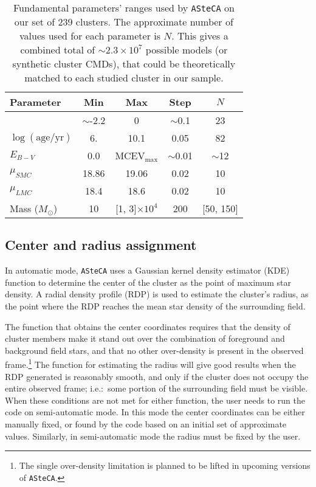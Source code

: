 \documentclass{aa}
\begin{document}
\begin{table}
\centering
\caption{Fundamental parameters' ranges used by \texttt{ASteCA} on our set
of 239 clusters. The approximate number of values used for each parameter is
$N$. This gives a combined total of ${\sim}2.3 {\times}10^7$ possible models 
(or synthetic cluster CMDs), that could be theoretically matched to each studied
cluster in our sample.}
\label{tab:ga-range}
\begin{tabular}{lcccc}
\hline\hline
 Parameter & Min & Max & Step & $N$\\
\hline
[Fe/H] & $\sim$-2.2 & 0 & $\sim$0.1 & 23\\
$\log\mathrm{(age/yr)}$ & 6. & 10.1 & 0.05 & 82\\
$E_{B-V}$ & 0.0 & MCEV$_{\max}$ & ${\sim}$0.01 & $\sim$12\\
$\mu_{SMC}$ & 18.86 & 19.06 & 0.02 & 10\\
$\mu_{LMC}$ & 18.4 & 18.6 & 0.02 & 10\\
Mass ($M_{\odot}$) & 10 & [1, 3]${\times}10^{4}$ & 200 & [50, 150]\\
\hline
\end{tabular}
\end{table}



\subsection{Center and radius assignment}
\label{ssec:centre-radius}

In automatic mode, \texttt{ASteCA} uses a Gaussian kernel density estimator 
(KDE) function to determine the center of the cluster as the point of maximum
star density.
A radial density profile (RDP) is used to estimate the cluster's radius, as the
point where the RDP reaches the mean star density of the surrounding field.

The function that obtains the center coordinates requires that the density of
cluster members make it stand out over the combination of foreground and
background field stars, and that no other over-density is present in the
observed frame.\footnote{The single over-density limitation is planned to be
lifted in upcoming versions of \texttt{ASteCA}.}
The function for estimating the radius will give good results when the RDP
generated is reasonably smooth, and only if the cluster does not occupy the
entire observed frame; i.e.:\ some portion of the surrounding field must be
visible.
%
When these conditions are not met for either function, the user needs to run
the code on semi-automatic mode. In this mode the center coordinates can be
either manually fixed, or found by the code based on an initial set of
approximate values. Similarly, in semi-automatic mode the radius must be fixed
by the user.
\end{document}
